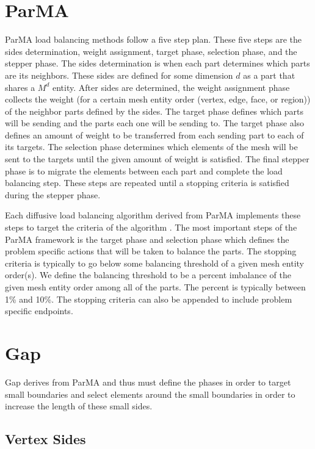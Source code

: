 \documentclass{thesis}
\begin{document}
\section{ParMA}

ParMA load balancing methods follow a five step plan. These five steps 
are the sides determination, weight assignment, target phase, selection
phase, and the stepper phase. The sides determination is when each part 
determines which parts are its neighbors. These sides are defined for some
 dimension $d$ as a part that shares a $M^d$ entity. After sides are 
determined, the weight assignment phase collects the weight (for a certain 
mesh entity order (vertex, edge, face, or region)) of the neighbor parts 
defined by the sides. The 
target phase defines which parts will be sending and the parts each one 
will be sending to. The target phase also defines an amount of weight to 
be transferred from each sending part to each of its targets. The selection 
phase determines which elements of the mesh will be sent to the targets 
until the given amount of weight is satisfied. The final stepper phase is 
to migrate the elements between each part and complete the load balancing 
step. These steps are repeated until a stopping criteria is satisfied 
during the stepper phase. 

Each diffusive load balancing algorithm derived from ParMA implements these 
steps to target the criteria of the algorithm \cite{parma}. The most important 
steps of the ParMA framework is the target phase and selection phase which 
defines the problem specific actions that will be taken to balance the parts. 
The stopping criteria is typically to go below some balancing threshold of 
a given mesh entity order(s). We define the balancing threshold to be a 
percent imbalance of the given mesh entity order among all of the parts. 
The percent is typically between 1\% and 10\%. The stopping criteria can also 
be appended to include problem specific endpoints.
 
  
\section{Gap}

Gap derives from ParMA and thus must define the phases in order to target 
small boundaries and select elements around the small boundaries in order 
to increase the length of these small sides. 

\subsection{Vertex Sides}
\end{document}
